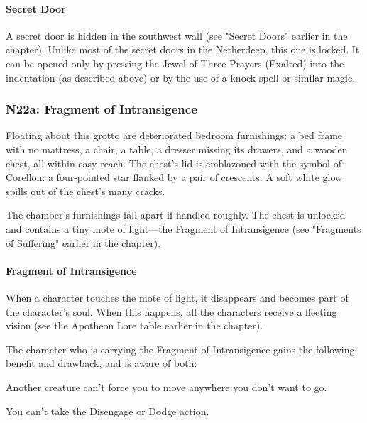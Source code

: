 \documentclass[10pt,a4paper,twoside,bg=print,twocolumn,openany,nodeprecatedcode]{dndbook}
\begin{document}
\paragraph{Secret Door}
A secret door is hidden in the southwest wall (see "Secret Doors" earlier in the chapter). Unlike most of the secret doors in the Netherdeep, this one is locked. It can be opened only by pressing the Jewel of Three Prayers (Exalted) into the indentation (as described above) or by the use of a knock spell or similar magic.

\subsubsection{N22a: Fragment of Intransigence}
\begin{DndReadAloud}{}
Floating about this grotto are deteriorated bedroom furnishings: a bed frame with no mattress, a chair, a table, a dresser missing its drawers, and a wooden chest, all within easy reach. The chest's lid is emblazoned with the symbol of Corellon: a four-pointed star flanked by a pair of crescents. A soft white glow spills out of the chest's many cracks.

\end{DndReadAloud}

The chamber's furnishings fall apart if handled roughly. The chest is unlocked and contains a tiny mote of light—the Fragment of Intransigence (see "Fragments of Suffering" earlier in the chapter).

\paragraph{Fragment of Intransigence}
When a character touches the mote of light, it disappears and becomes part of the character's soul. When this happens, all the characters receive a fleeting vision (see the Apotheon Lore table earlier in the chapter).

The character who is carrying the Fragment of Intransigence gains the following benefit and drawback, and is aware of both:

\begin{DndComment}{}

\begin{description}[nolistsep]
\item[Benefit.]
Another creature can't force you to move anywhere you don't want to go.
\item[Drawback.]
You can't take the Disengage or Dodge action.
\end{description}



\end{DndComment}
\end{document}
